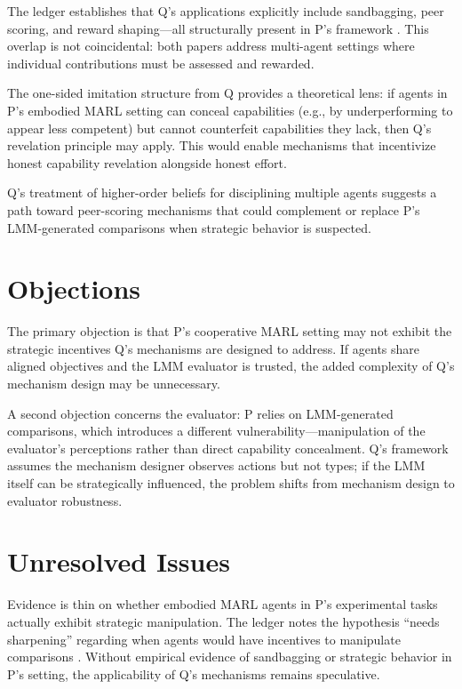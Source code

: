 \documentclass{article}
\begin{document}
The ledger establishes that Q's applications explicitly include sandbagging, peer scoring, and reward shaping---all structurally present in P's framework . This overlap is not coincidental: both papers address multi-agent settings where individual contributions must be assessed and rewarded.

The one-sided imitation structure from Q provides a theoretical lens: if agents in P's embodied MARL setting can conceal capabilities (e.g., by underperforming to appear less competent) but cannot counterfeit capabilities they lack, then Q's revelation principle may apply. This would enable mechanisms that incentivize honest capability revelation alongside honest effort.

Q's treatment of higher-order beliefs for disciplining multiple agents suggests a path toward peer-scoring mechanisms that could complement or replace P's LMM-generated comparisons when strategic behavior is suspected.

\section*{Objections}

The primary objection is that P's cooperative MARL setting may not exhibit the strategic incentives Q's mechanisms are designed to address. If agents share aligned objectives and the LMM evaluator is trusted, the added complexity of Q's mechanism design may be unnecessary.

A second objection concerns the evaluator: P relies on LMM-generated comparisons, which introduces a different vulnerability---manipulation of the evaluator's perceptions rather than direct capability concealment. Q's framework assumes the mechanism designer observes actions but not types; if the LMM itself can be strategically influenced, the problem shifts from mechanism design to evaluator robustness.

\section*{Unresolved Issues}

Evidence is thin on whether embodied MARL agents in P's experimental tasks actually exhibit strategic manipulation. The ledger notes the hypothesis ``needs sharpening'' regarding when agents would have incentives to manipulate comparisons . Without empirical evidence of sandbagging or strategic behavior in P's setting, the applicability of Q's mechanisms remains speculative.
\end{document}
